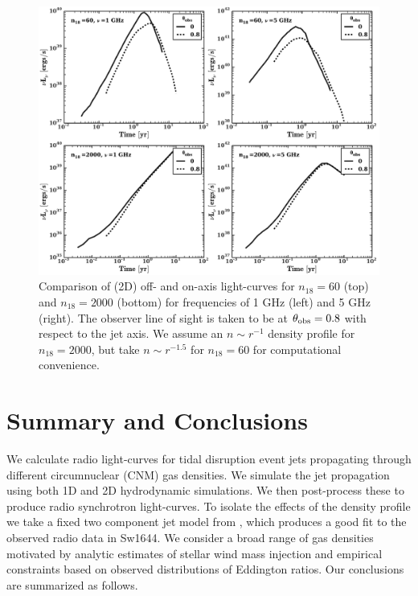 \documentclass[usenatbib,fleqn]{mnras}
\begin{document}
\begin{figure}
\includegraphics[width=16cm]{on_off.pdf}
\caption{\label{fig:onOff} Comparison of (2D) off- and on-axis
  light-curves for $n_{18}=60$ (top) and $n_{18}=2000$ (bottom) for
  frequencies of 1 GHz (left) and 5 GHz (right). The observer line of
  sight is taken to be at $\theta_{\rm obs}=0.8$ with respect to the
  jet axis. We assume an $n\sim r^{-1}$ density profile for
  $n_{18}=2000$, but take $n\sim r^{-1.5}$ for $n_{18}=60$ for
  computational convenience.}
\end{figure}



\section{Summary and Conclusions}
\label{sec:conc}

We calculate radio light-curves for tidal disruption event jets
propagating through different circumnuclear (CNM) gas densities. We
simulate the jet propagation using both 1D and 2D hydrodynamic
simulations. We then post-process these to produce radio synchrotron
light-curves. To isolate the effects of the density profile we take a
fixed two component jet model from \citet{Mimica+2015}, which produces
a good fit to the observed radio data in Sw1644. We
consider a broad range of gas densities motivated by analytic
estimates of stellar wind mass injection and empirical constraints
based on observed distributions of Eddington ratios. Our conclusions
are summarized as follows.
\end{document}
